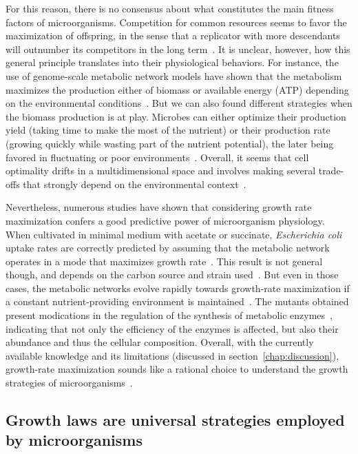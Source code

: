 For this reason, there is no consensus about what constitutes the main fitness factors of microorganisms.
Competition for common resources seems to favor the maximization of offspring, in the sense that a replicator with more descendants will outnumber its competitors in the long term~\cite{dawkins_selfish_1976}.
It is unclear, however, how this general principle translates into their physiological behaviors.
For instance, the use of genome-scale metabolic network models have shown that the metabolism maximizes the production either of biomass or available energy (ATP) depending on the environmental conditions~\cite{schuetz_systematic_2007}.
But we can also found different strategies when the biomass production is at play.
Microbes can either optimize their production yield (taking time to make the most of the nutrient) or their production rate (growing quickly while wasting part of the nutrient potential), the later being favored in fluctuating or poor environments~\cite{frank_tradeoff_2010,maclean_tragedy_2008,schuster_maximization_2008}.
Overall, it seems that cell optimality drifts in a multidimensional space and involves making several trade-offs that strongly depend on the environmental context~\cite{schuetz_multidimensional_2012}.

Nevertheless, numerous studies have shown that considering growth rate maximization confers a good predictive power of microorganism physiology.
When cultivated in minimal medium with acetate or succinate, \textit{Escherichia coli} uptake rates are correctly predicted by assuming that the metabolic network operates in a mode that maximizes growth rate~\cite{edwards_silico_2001}.
This result is not general though, and depends on the carbon source and strain used~\cite{ibarra_escherichia_2002}.
But even in those cases, the metabolic networks evolve rapidly towards growth-rate maximization if a constant nutrient-providing environment is maintained~\cite{ibarra_escherichia_2002}.
The mutants obtained present modications in the regulation of the synthesis of metabolic enzymes~\cite{lewis_omic_2010}, indicating that not only the efficiency of the enzymes is affected, but also their abundance and thus the cellular composition.
Overall, with the currently available knowledge and its limitations (discussed in section~\ref{chap:discussion}), growth-rate maximization sounds like a rational choice to understand the growth strategies of microorganisms~\cite{molenaar_shifts_2009}.

\subsection{Growth laws are universal strategies employed by microorganisms}

